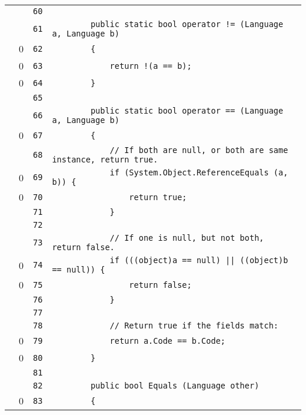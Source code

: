 \documentclass[a4paper,10pt]{article}
\begin{document}
\begin{longtable}[l]{lrrl}
\cellcolor{gray} &  & \verb~60~ & \verb~~\\
\cellcolor{gray} &  & \verb~61~ & \verb~        public static bool operator != (Language a, Language b)~\\
\cellcolor{red} & 0 & \verb~62~ & \verb~        {~\\
\cellcolor{red} & 0 & \verb~63~ & \verb~            return !(a == b);~\\
\cellcolor{red} & 0 & \verb~64~ & \verb~        }~\\
\cellcolor{gray} &  & \verb~65~ & \verb~~\\
\cellcolor{gray} &  & \verb~66~ & \verb~        public static bool operator == (Language a, Language b)~\\
\cellcolor{red} & 0 & \verb~67~ & \verb~        {~\\
\cellcolor{gray} &  & \verb~68~ & \verb~            // If both are null, or both are same instance, return true.~\\
\cellcolor{red} & 0 & \verb~69~ & \verb~            if (System.Object.ReferenceEquals (a, b)) {~\\
\cellcolor{red} & 0 & \verb~70~ & \verb~                return true;~\\
\cellcolor{gray} &  & \verb~71~ & \verb~            }~\\
\cellcolor{gray} &  & \verb~72~ & \verb~~\\
\cellcolor{gray} &  & \verb~73~ & \verb~            // If one is null, but not both, return false.~\\
\cellcolor{red} & 0 & \verb~74~ & \verb~            if (((object)a == null) || ((object)b == null)) {~\\
\cellcolor{red} & 0 & \verb~75~ & \verb~                return false;~\\
\cellcolor{gray} &  & \verb~76~ & \verb~            }~\\
\cellcolor{gray} &  & \verb~77~ & \verb~~\\
\cellcolor{gray} &  & \verb~78~ & \verb~            // Return true if the fields match:~\\
\cellcolor{red} & 0 & \verb~79~ & \verb~            return a.Code == b.Code;~\\
\cellcolor{red} & 0 & \verb~80~ & \verb~        }~\\
\cellcolor{gray} &  & \verb~81~ & \verb~~\\
\cellcolor{gray} &  & \verb~82~ & \verb~        public bool Equals (Language other)~\\
\cellcolor{red} & 0 & \verb~83~ & \verb~        {~\\

\end{longtable}
\end{document}
